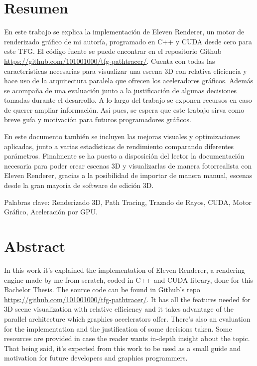 \chapter*{Resumen}

En este trabajo se explica la implementación de Eleven Renderer, un motor de renderizado gráfico de mi autoría, programado en C++ y CUDA desde cero para este TFG. El código fuente se puede encontrar en el repositorio Github \url{https://github.com/101001000/tfg-pathtracer/}. Cuenta con todas las características necesarias para visualizar una escena 3D con relativa eficiencia y hace uso de la arquitectura paralela que ofrecen los aceleradores gráficos. Además se acompaña de una evaluación junto a la justificación de algunas decisiones tomadas durante el desarrollo. A lo largo del trabajo se exponen recursos en caso de querer ampliar información. Así pues, se espera que este trabajo sirva como breve guía y motivación para futuros programadores gráficos.

En este documento también se incluyen las mejoras visuales y optimizaciones aplicadas, junto a varias estadísticas de rendimiento comparando diferentes parámetros. Finalmente se ha puesto a disposición del lector la documentación necesaria para poder crear escenas 3D y visualizarlas de manera fotorrealista con Eleven Renderer, gracias a la posibilidad de importar de manera manual, escenas desde la gran mayoría de software de edición 3D. 

Palabras clave: Renderizado 3D, Path Tracing, Trazado de Rayos, CUDA, Motor Gráfico, Aceleración por GPU.

\chapter*{Abstract}


In this work it's explained the implementation of Eleven Renderer, a rendering engine made by me from scratch, coded in C++ and CUDA library, done for this Bachelor Thesis. The source code can be found in Github's repo \url{https://github.com/101001000/tfg-pathtracer/}. It has all the features needed for 3D scene visualization with relative efficiency and it takes advantage of the parallel architecture which graphics accelerators offer. There's also an evaluation for the implementation and the justification of some decisions taken. Some resources are provided in case the reader wants in-depth insight about the topic. That being said, it's expected from this work to be used as a small guide and motivation for future developers and graphics programmers.

